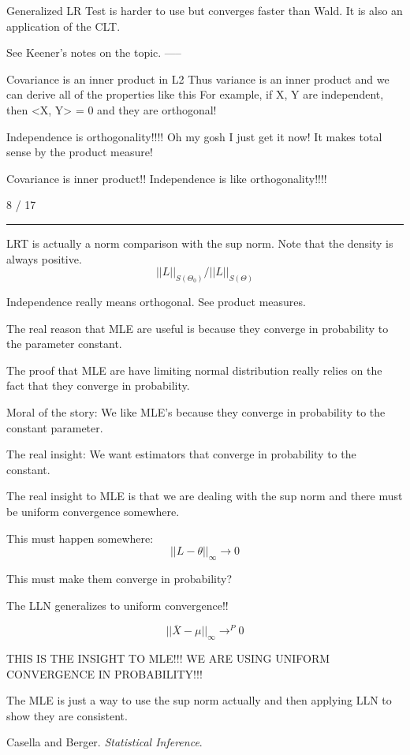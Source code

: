 \documentclass[12pt, reqno]{amsart}
\numberwithin{equation}{section}
\newcommand{\mean}{\overline}
\begin{document}
Generalized LR Test is harder to use but converges faster than Wald. It is also an application of the CLT.

See Keener's notes on the topic.
-----

Covariance is an inner product in L2
Thus variance is an inner product and we can derive all of the properties like this
For example, if X, Y are independent, then <X, Y> = 0 and they are orthogonal!

Independence is orthogonality!!!!
Oh my gosh I just get it now!
It makes total sense by the product measure!

Covariance is inner product!!
Independence is like orthogonality!!!!

8 / 17
\rule{\textwidth}{.5pt}

LRT is actually a norm comparison with the sup norm. Note that the density is always positive.
\[
|| L ||_{S(\Theta_0)} / || L ||_{S(\Theta)} 
\]

Independence really means orthogonal. See product measures.

The real reason that MLE are useful is because they converge in probability to the parameter constant.

The proof that MLE are have limiting normal distribution really relies on the fact that they converge in probability.

Moral of the story: We like MLE's because they converge in probability to the constant parameter.

The real insight: We want estimators that converge in probability to the constant.

The real insight to MLE is that we are dealing with the sup norm and there must be uniform convergence somewhere.

This must happen somewhere:
\[
|| L - \theta ||_{\infty} \to 0
\]

This must make them converge in probability?

The LLN generalizes to uniform convergence!!

\[
|| \mean{X} - \mu ||_{\infty} \to^{P} 0
\]

THIS IS THE INSIGHT TO MLE!!! WE ARE USING UNIFORM CONVERGENCE IN PROBABILITY!!!

The MLE is just a way to use the sup norm actually and then applying LLN to show they are consistent.




\begin{thebibliography}{1}

Casella and Berger. \textit{Statistical Inference}.
\end{thebibliography}
\end{document}
